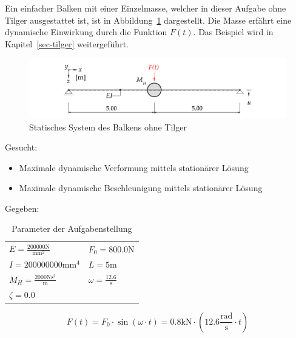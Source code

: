 \documentclass[
  letterpaper,
  DIV=11]{scrreprt}
\providecommand{\tightlist}{%
  \setlength{\itemsep}{0pt}\setlength{\parskip}{0pt}}\usepackage{longtable,booktabs,array}
\begin{document}
Ein einfacher Balken mit einer Einzelmasse, welcher in dieser Aufgabe
ohne Tilger ausgestattet ist, ist in
Abbildung~\ref{fig-ems_untilg_system_ohne_tilger} dargestellt. Die Masse
erfährt eine dynamische Einwirkung durch die Funktion \(F(t)\). Das
Beispiel wird in Kapitel~\ref{sec-tilger} weitergeführt.

\begin{figure}[H]

{\centering \includegraphics{index_files/mediabag/bilder/aufgabe_ems_untilg_system.pdf}

}

\caption{\label{fig-ems_untilg_system_ohne_tilger}Statisches System des
Balkens ohne Tilger}

\end{figure}

Gesucht:

\begin{itemize}
\tightlist
\item
  Maximale dynamische Verformung mittels stationärer Lösung
\item
  Maximale dynamische Beschleunigung mittels stationärer Lösung
\end{itemize}

Gegeben:

\hypertarget{tbl-parameter_mms3}{}
\begin{longtable}[]{@{}
  >{\raggedright\arraybackslash}p{}
  >{\raggedright\arraybackslash}p{}@{}}
\caption{\label{tbl-parameter_mms3}Parameter der
Aufgabenstellung}\tabularnewline
\toprule\noalign{}
\endfirsthead
\endhead
\bottomrule\noalign{}
\endlastfoot
\(E = \frac{200000 \text{N}}{\text{mm}^{2}}\) &
\(F_{0} = 800.0 \text{N}\) \\
\(I = 200000000 \text{mm}^{4}\) & \(L = 5 \text{m}\) \\
\(M_{H} = \frac{2000 \text{N} \text{s}^{2}}{\text{m}}\) &
\(\omega = \frac{12.6}{\text{s}}\) \\
\(\zeta = 0.0\) & \\
\end{longtable}

\[
F(t) = F_0 \cdot \sin(\omega\cdot t) = 0.8 \text{kN} \cdot (12.6 \frac{\text{rad}}{\text{s}}\cdot t)
\]
\end{document}
